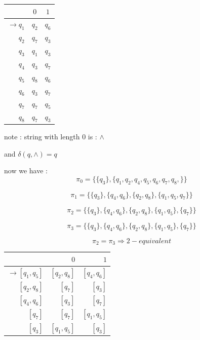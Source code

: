 \documentclass[12pt]{book}
\begin{document}
\begin{tabular}{r | c c  } 
     & $0$ & $1$  \\
\hline
$\to q_{1}$ & $q_{2}$ & $q_{6}$   \\
$q_{2}$ & $q_{7}$ & $q_{3}$    \\
$q_{3}$ & $q_{1}$ & $q_{3}$    \\
$q_{4}$ & $q_{3}$ & $q_{7}$    \\
$q_{5}$ & $q_{8}$ & $q_{6}$    \\
$q_{6}$ & $q_{3}$ & $q_{7}$    \\
$q_{7}$ & $q_{7}$ & $q_{5}$    \\
$q_{8}$ & $q_{7}$ & $q_{3}$    \\
\end{tabular}

note : string with length $0$ is : $\wedge$

and $\delta(q , \wedge) = q$

now we have :
$$
\pi_{0} = \{ \{ q_{3}\} , \{ q_{1}, q_{2}, q_{4}, q_{5}, q_{6}, q_{7}, q_{8}, \} \}
$$

$$
\pi_{1} = \{ \{ q_{3}\} , \{  q_{4},  q_{6}\} , \{  q_{2},  q_{8}\} , \{  q_{1},  q_{5}, q_{7} \} \}
$$

$$
\pi_{2} = \{ \{ q_{3}\} , \{  q_{4},  q_{6}\} , \{  q_{2},  q_{8}\} , \{  q_{1},  q_{5} \} ,  \{ q_{7} \} \}
$$


$$
\pi_{3} = \{ \{ q_{3}\} , \{  q_{4},  q_{6}\} , \{  q_{2},  q_{8}\} , \{  q_{1},  q_{5} \} ,  \{ q_{7} \} \}
$$

$$
\pi_{2} = \pi_{3} \Rightarrow 2-equivalent
$$



\begin{tabular}{r | r r  } 
     & $0$ & $1$  \\
\hline
$\to [q_{1} , q_{5}] $ & $[q_{2}, q_{8}]$ & $[q_{4}, q_{6}]$   \\
$[q_{2}, q_{8}]$ & $[q_{7}]$ & $[q_{3}]$    \\
$[q_{4}, q_{6}]$ & $[q_{3}]$ & $[q_{7}]$    \\
$[q_{7}]$ & $[q_{7}]$ & $[q_{1}, q_{5}]$    \\
$[q_{3}]$ & $[q_{1}, q_{5}]$ & $[q_{3}]$    \\
\end{tabular}



\end{document}
